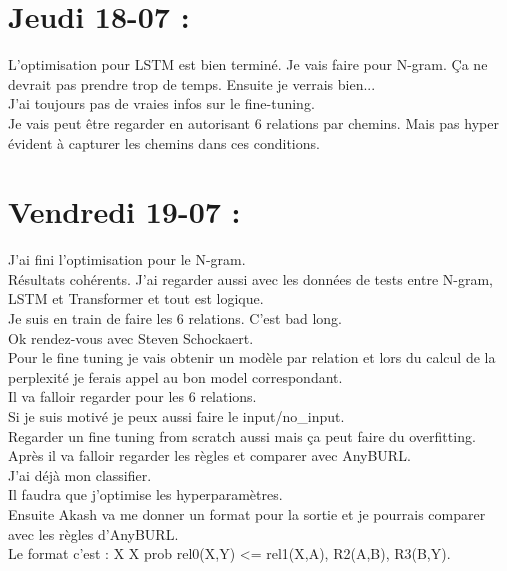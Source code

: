 \documentclass{article}
\begin{document}
\section*{Jeudi 18-07 :}
L'optimisation pour LSTM est bien terminé. Je vais faire pour N-gram. Ça ne devrait pas prendre trop de temps. Ensuite je verrais bien...\\
J'ai toujours pas de vraies infos sur le fine-tuning.\\
Je vais peut être regarder en autorisant 6 relations par chemins. Mais pas hyper évident à capturer les chemins dans ces conditions.
\section*{Vendredi 19-07 :}
J'ai fini l'optimisation pour le N-gram.\\
Résultats cohérents. J'ai regarder aussi avec les données de tests entre N-gram, LSTM et Transformer et tout est logique.\\
Je suis en train de faire les 6 relations. C'est bad long.\\
Ok rendez-vous avec Steven Schockaert.\\
Pour le fine tuning je vais obtenir un modèle par relation et lors du calcul de la perplexité je ferais appel au bon model correspondant.\\
Il va falloir regarder pour les 6 relations.\\
Si je suis motivé je peux aussi faire le input/no\_input.\\
Regarder un fine tuning from scratch aussi mais ça peut faire du overfitting.\\
Après il va falloir regarder les règles et comparer avec AnyBURL.\\
J'ai déjà mon classifier.\\
Il faudra que j'optimise les hyperparamètres.\\
Ensuite Akash va me donner un format pour la sortie et je pourrais comparer avec les règles d'AnyBURL.\\
Le format c'est :
X   X   prob    rel0(X,Y) <= rel1(X,A), R2(A,B), R3(B,Y).\\
\end{document}
